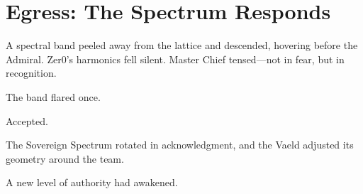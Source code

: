 \section*{Egress: The Spectrum Responds}
A spectral band peeled away from the lattice and descended, hovering before
the Admiral. Zer0’s harmonics fell silent. Master Chief tensed—not in fear,
but in recognition.

The band flared once.

Accepted.

The Sovereign Spectrum rotated in acknowledgment, and the Vaeld adjusted its
geometry around the team.

A new level of authority had awakened.
